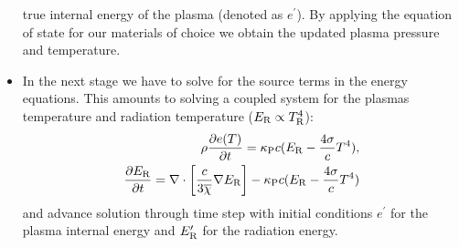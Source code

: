 \documentclass[12pt]{article}
\begin{document}
\begin{itemize}
true internal energy of the plasma (denoted as $e^\prime$). By applying the 
equation of state for our materials of choice we obtain the updated plasma 
pressure and temperature.   
\item In the next stage we have to solve for the source terms in the energy 
equations. This amounts to solving a coupled system for the plasmas 
temperature and radiation temperature ($E_{\rm R} \propto T_{\rm R}^4$): 
\begin{eqnarray}\label{radscheme} \rho \frac{\partial e(T)}{\partial t} = 
\kappa_{\rm P} c (E_{\rm R} - \frac{4\sigma}{c} T^4), \\ 
\frac{\partial E_{\rm R}}{\partial t} = \nabla\cdot\left[ 
\frac{c}{ 3\overline{\chi} } \nabla E_{\rm R} \right]   - 
\kappa_{\rm P} c (E_{\rm R} - \frac{4\sigma}{c} T^4) 
\end{eqnarray} 
and advance solution through time step with initial conditions 
$e^\prime$ for the plasma internal energy and $E_{\rm R}^\prime$ for the 
radiation energy.  
\end{itemize}  
\end{document}
